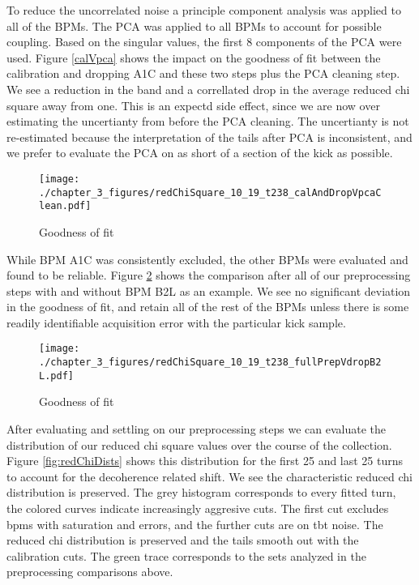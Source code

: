 To reduce the uncorrelated noise a principle component analysis was applied to all of the BPMs. The PCA was applied to all BPMs to account for possible coupling. Based on the singular values, the first 8 components of the PCA were used. Figure \ref{calVpca} shows the impact on the goodness of fit between the calibration and dropping A1C and these two steps plus the PCA cleaning step. We see a reduction in the band and a correllated drop in the average reduced chi square away from one. This is an expectd side effect, since we are now over estimating the uncertianty from before the PCA cleaning. The uncertianty is not re-estimated because the interpretation of the tails after PCA is inconsistent, and we prefer to evaluate the PCA on as short of a section of the kick as possible.

\begin{figure}
    \centering
    \texttt{[image: ./chapter\_3\_figures/redChiSquare\_10\_19\_t238\_calAndDropVpcaClean.pdf]}
    \caption{Goodness of fit}
    \label{fig:calVpca}
\end{figure}

While BPM A1C was consistently excluded, the other BPMs were evaluated and found to be reliable. Figure \ref{fig:prepVB2L} shows the comparison after all of our preprocessing steps with and without BPM B2L as an example. We see no significant deviation in the goodness of fit, and retain all of the rest of the BPMs unless there is some readily identifiable acquisition error with the particular kick sample.

\begin{figure}
    \centering
    \texttt{[image: ./chapter\_3\_figures/redChiSquare\_10\_19\_t238\_fullPrepVdropB2L.pdf]}
    \caption{Goodness of fit}
    \label{fig:prepVB2L}
\end{figure}

After evaluating and settling on our preprocessing steps we can evaluate the distribution of our reduced chi square values over the course of the collection. Figure \ref{fig:redChiDists} shows this distribution for the first 25 and last 25 turns to account for the decoherence related shift. We see the characteristic reduced chi distribution is preserved. The grey histogram corresponds to every fitted turn, the colored curves indicate increasingly aggresive cuts. The first cut excludes bpms with saturation and errors, and the further cuts are on tbt noise. The reduced chi distribution is preserved and the tails smooth out with the calibration cuts. The green trace corresponds to the sets analyzed in the preprocessing comparisons above.

